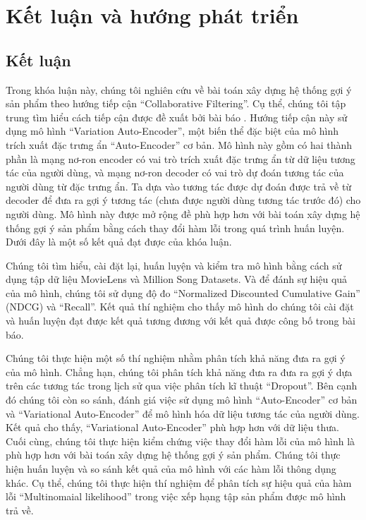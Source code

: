 \chapter{Kết luận và hướng phát triển}
\label{Chapter5}
\section{Kết luận}
Trong khóa luận này, chúng tôi nghiên cứu về bài toán xây dựng hệ thống gợi ý sản phẩm theo hướng tiếp cận ``Collaborative Filtering''.
Cụ thể, chúng tôi tập trung tìm hiểu cách tiếp cận được đề xuất bởi bài báo \cite{mvae}.
Hướng tiếp cận này sử dụng mô hình ``Variation Auto-Encoder'', một biến thể đặc biệt của mô hình trích xuất đặc trưng ẩn ``Auto-Encoder'' cơ bản. 
Mô hình này gồm có hai thành phần là mạng nơ-ron encoder có vai trò trích xuất đặc trưng ẩn từ dữ liệu tương tác của người dùng, và mạng nơ-ron decoder có vai trò dự đoán tương tác của người dùng từ đặc trưng ẩn.
Ta dựa vào tương tác được dự đoán được trả về từ decoder để đưa ra gợi ý tương tác (chưa được người dùng tương tác trước đó) cho người dùng.
Mô hình này được mở rộng đề phù hợp hơn với bài toán xây dựng hệ thống gợi ý sản phẩm bằng cách thay đổi hàm lỗi trong quá trình huấn luyện.
Dưới đây là một số kết quả đạt được của khóa luận. 

Chúng tôi tìm hiểu, cài đặt lại, huấn luyện và kiểm tra mô hình bằng cách sử dụng tập dữ liệu MovieLens và Million Song Datasets. 
Và để đánh sự hiệu quả của mô hình, chúng tôi sử dụng độ đo ``Normalized Discounted Cumulative Gain'' (NDCG) và ``Recall''.
Kết quả thí nghiệm cho thấy mô hình do chúng tôi cài đặt và huấn luyện đạt được kết quả tương đương với kết quả được công bố trong bài báo. 

Chúng tôi thực hiện một số thí nghiệm nhằm phân tích khả năng đưa ra gợi ý của mô hình.
Chẳng hạn, chúng tôi phân tích khả năng đưa ra đưa ra gợi ý dựa trên các tương tác trong lịch sử qua việc phân tích kĩ thuật ``Dropout''.
Bên cạnh đó chúng tôi còn so sánh, đánh giá việc sử dụng mô hình ``Auto-Encoder'' cơ bản và ``Variational Auto-Encoder'' để mô hình hóa dữ liệu tương tác của người dùng. 
Kết quả cho thấy, ``Variational Auto-Encoder'' phù hợp hơn với dữ liệu thưa.
Cuối cùng, chúng tôi thực hiện kiểm chứng việc thay đổi hàm lỗi của mô hình là phù hợp hơn với bài toán xây dựng hệ thống gợi ý sản phẩm.
Chúng tôi thực hiện huấn luyện và so sánh kết quả của mô hình với các hàm lỗi thông dụng khác. 
Cụ thể, chúng tôi thực hiện thí nghiệm để phân tích sự hiệu quả của hàm lỗi ``Multinomaial likelihood'' trong việc xếp hạng tập sản phẩm được mô hình trả về.

